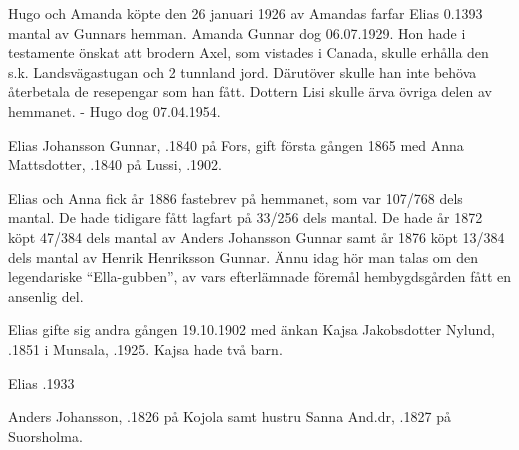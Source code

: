 Hugo och Amanda köpte den 26 januari 1926 av Amandas farfar Elias 0.1393 mantal av Gunnars hemman. Amanda Gunnar dog 06.07.1929. Hon hade i testamente önskat att brodern Axel, som vistades i Canada, skulle erhålla den s.k. Landsvägastugan och 2 tunnland jord. Därutöver skulle han inte behöva återbetala de resepengar som han fått. Dottern Lisi skulle ärva övriga delen av hemmanet. - Hugo dog 07.04.1954.



%
Elias Johansson Gunnar, .1840 på Fors, gift första gången 1865 med Anna Mattsdotter, .1840 på Lussi, .1902.
\begin{jhchildren}
  \item {}
  \item {}
  \item {}
\end{jhchildren}

Elias och Anna fick år 1886 fastebrev på hemmanet, som var 107/768 dels mantal. De hade tidigare fått lagfart på 33/256 dels mantal. De hade år 1872 köpt 47/384 dels mantal av Anders Johansson Gunnar samt år 1876 köpt 13/384 dels mantal av Henrik Henriksson Gunnar. Ännu idag hör man talas om den legendariske ``Ella-gubben'', av vars efterlämnade föremål hembygdsgården fått en ansenlig del.

Elias gifte sig andra gången 19.10.1902 med änkan Kajsa Jakobsdotter Nylund, .1851 i Munsala, .1925. Kajsa hade två barn.
\begin{jhchildren}
  \item {}
  \item {}
\end{jhchildren}

Elias .1933


%
Anders Johansson, .1826 på Kojola samt hustru Sanna And.dr, .1827 på Suorsholma.
\begin{jhchildren}
  \item {}
  \item {}
  \item {}
\end{jhchildren}

